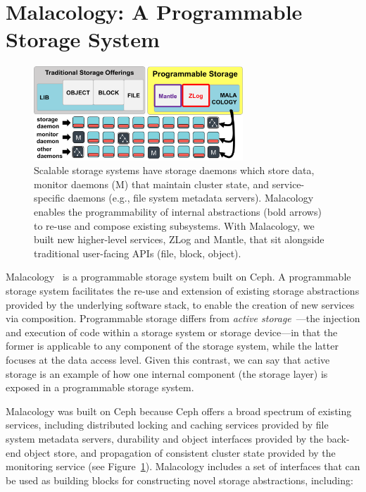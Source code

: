 \section{Malacology: A Programmable Storage System}

\begin{figure}[tb]
\centering
\includegraphics[width=0.7\textwidth]{./chapters/background/figures/overview.png}
\caption{Scalable storage systems have storage daemons which store data,
monitor daemons (M) that maintain cluster state, and service-specific daemons
(e.g., file system metadata servers). Malacology enables the programmability of
internal abstractions (bold arrows) to re-use and compose existing subsystems.
With Malacology, we built new higher-level services, ZLog and Mantle, that sit
alongside traditional user-facing APIs (file, block,
object).}\label{fig:overview}
\end{figure}

Malacology~\cite{sevilla:eurosys17-malacology} is a programmable storage system
built on Ceph. A programmable storage system facilitates the re-use and
extension of existing storage abstractions provided by the underlying software
stack, to enable the creation of new services via composition.  Programmable
storage differs from \emph{active storage}~\cite{riedel:vldb98}---the injection
and execution of code within a storage system or storage device---in that the
former is applicable to any component of the storage system, while the latter
focuses at the data access level. Given this contrast, we can say that active
storage is an example of how one internal component (the storage layer) is
exposed in a programmable storage system.

Malacology was built on Ceph because Ceph offers a broad spectrum of existing
services, including distributed locking and caching services provided by file
system metadata servers, durability and object interfaces provided by the
back-end object store, and propagation of consistent cluster state provided by
the monitoring service (see Figure~\ref{fig:overview}).  Malacology includes a
set of interfaces that can be used as building blocks for constructing novel
storage abstractions, including:

